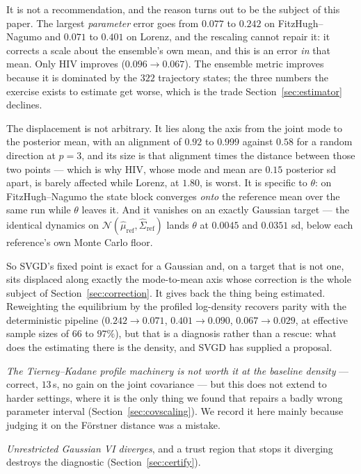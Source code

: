 \documentclass[11pt]{article}
\theoremstyle{plain}
\theoremstyle{definition}
\theoremstyle{remark}
\begin{document}
It is not a recommendation, and the reason turns out to be the subject of this paper. The largest
\emph{parameter} error goes from $0.077$ to $0.242$ on FitzHugh--Nagumo and $0.071$ to $0.401$ on
Lorenz, and the rescaling cannot repair it: it corrects a scale about the ensemble's own mean, and
this is an error \emph{in} that mean. Only HIV improves ($0.096 \to 0.067$). The ensemble metric
improves because it is dominated by the $322$ trajectory states; the three numbers the exercise
exists to estimate get worse, which is the trade Section~\ref{sec:estimator} declines.

The displacement is not arbitrary. It lies along the axis from the joint mode to the posterior
mean, with an alignment of $0.92$ to $0.999$ against $0.58$ for a random direction at $p=3$, and
its size is that alignment times the distance between those two points --- which is why HIV, whose
mode and mean are $0.15$ posterior sd apart, is barely affected while Lorenz, at $1.80$, is worst.
It is specific to $\theta$: on FitzHugh--Nagumo the state block converges \emph{onto} the reference
mean over the same run while $\theta$ leaves it. And it vanishes on an exactly Gaussian target ---
the identical dynamics on $\mathcal N(\hat\mu_{\mathrm{ref}}, \hat\Sigma_{\mathrm{ref}})$ lands
$\theta$ at $0.0045$ and $0.0351$ sd, below each reference's own Monte Carlo floor.

So SVGD's fixed point is exact for a Gaussian and, on a target that is not one, sits displaced
along exactly the mode-to-mean axis whose correction is the whole subject of
Section~\ref{sec:correction}. It gives back the thing being estimated. Reweighting the equilibrium
by the profiled log-density recovers parity with the deterministic pipeline
($0.242 \to 0.071$, $0.401 \to 0.090$, $0.067 \to 0.029$, at effective sample sizes of $66$ to
$97\%$), but that is a diagnosis rather than a rescue: what does the estimating there is the
density, and SVGD has supplied a proposal.

\emph{The Tierney--Kadane profile machinery is not worth it at the baseline density} --- correct,
$13$\,s, no gain on the joint covariance --- but this does not extend to harder settings, where it
is the only thing we found that repairs a badly wrong parameter interval
(Section~\ref{sec:covscaling}). We record it here mainly because judging it on the F\"orstner
distance was a mistake.

\emph{Unrestricted Gaussian VI diverges}, and a trust region that stops it diverging destroys the
diagnostic (Section~\ref{sec:certify}).
\end{document}
